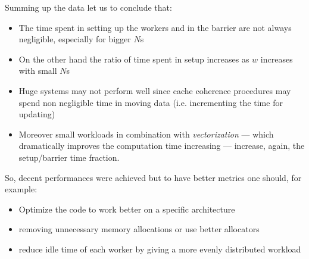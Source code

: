 Summing up the data let us to conclude that:
\begin{itemize}
	\item The time spent in setting up the workers and in the barrier are not always negligible, especially for bigger $N$s
	\item On the other hand the ratio of time spent in setup increases as $w$ increases with small $N$s 
	\item Huge systems may not perform well since cache coherence procedures may spend non negligible time in moving data (i.e. incrementing the time for updating)
	\item Moreover small workloads in combination with \emph{vectorization} --- which dramatically improves the computation time increasing --- increase, again, the setup/barrier time fraction.
\end{itemize}

So, decent performances were achieved but to have better metrics one should, for example:
\begin{itemize}
	\item Optimize the code to work better on a specific architecture
	\item removing unnecessary memory allocations or use better allocators
	\item reduce idle time of each worker by giving a more evenly distributed workload
\end{itemize} 
